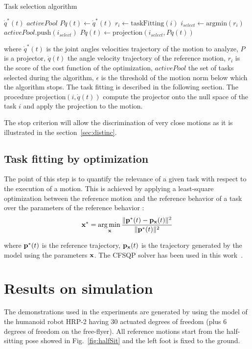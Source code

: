 \documentclass[letterpaper, 10pt, conference]{ieeeconf}      %
\begin{document}
\begin{algorithm}
  \caption{Task selection algorithm}
  \label{alg:taskSelection}
\begin{algorithmic}[1]
\STATE \shINPUT $\dot{q}^{*}(t)$
\STATE \shOUTPUT $activePool$
\STATE $P\dot{q}(t)\gets \dot{q}^{*}(t)$
    \STATE $r_i \gets \mathrm{taskFitting}(i)$
  \ENDFOR
  \STATE $i_{select} \gets \mathrm{argmin}(r_i)$
  \STATE $activePool.\mathrm{push}(i_{select})$
  \STATE $P\dot{q}(t) \gets \mathrm{projection}(i_{select}, P\dot{q}(t))$
\ENDWHILE
\end{algorithmic}
\end{algorithm}
where  $\dot{q}^{*}(t)$ is the joint angles velocities trajectory of the motion to analyze,
$P$ is a projector, $\dot{q}(t)$ the angle velocity trajectory
of the reference motion, $r_i$ is the score of the cost function of the optimization, $activePool$
the set of tasks selected during the algorithm, $\epsilon$ is the threshold
of the motion norm below which the algorithm stops. The task fitting is described
in the following section. The procedure $\mathrm{projection}(i, \dot{q}(t))$ compute the projector onto
the null space of the task $i$ and apply the projection to the motion.

The stop criterion will allow the discrimination of very close motions as it is illustrated in
the section~\ref{sec:distinc}.

\subsection{Task fitting by optimization} \label{sec:alg2:proj}
The point of this step is to quantify the relevance of a given task with respect to
the execution of a motion. This is achieved by applying a least-square optimization
between the reference motion and the reference behavior of a task over the parameters
of the reference behavior :
\begin{equation}
	{\mathbf{x}}^* = \underset{{\mathbf{x}}}{\operatorname*{arg\,min\,}} \frac{\Vert {\mathbf{p}}^*(t) - {\mathbf{p}}_{\mathbf{x}}(t) \Vert^2}{\Vert {\mathbf{p}}^*(t) \Vert^2}
\label{optimProblem}
\end{equation}

\noindent where ${\mathbf{p}}^*(t)$ is the reference trajectory, ${\mathbf{p}}_{\mathbf{x}}(t)$ is the trajectory
generated by the model using the parameters ${\mathbf{x}}$. The CFSQP solver has been used in this work~\cite{lawrence97}.

\section{Results on simulation}
The demonstrations used in the experiments are generated by using the model
of the humanoid robot HRP-2 having 30 actuated degrees of freedom (plus 6 degrees of freedom on the
free-flyer). All reference motions start from the half-sitting pose showed in Fig.~\ref{fig:halfSit} and
the left foot is fixed to the ground.
\end{document}

